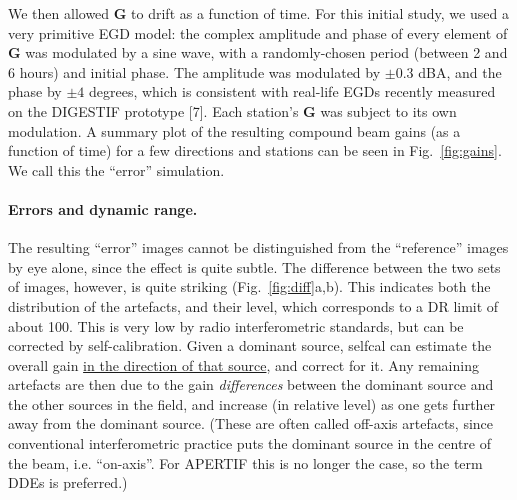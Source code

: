 \documentclass{aps2010} \special{papersize=8.5in,11in}
\begin{document}
We then allowed $\mathbf{G}$ to drift as a function of time. For this initial study, we used a very primitive EGD model: the complex amplitude and phase of every element of $\mathbf{G}$ was modulated by a  sine wave, with a randomly-chosen period (between 2 and 6 hours) and initial phase. The amplitude was modulated by $\pm0.3$ dBA, and the phase by $\pm4$ degrees, which is consistent with real-life EGDs recently measured on the DIGESTIF prototype
[7]. Each station's $\mathbf{G}$ was subject to its own modulation. A summary plot of the resulting compound beam gains (as a function of time) for a few directions and stations can be seen in Fig.~\ref{fig:gains}. We call this the ``error'' simulation.

\paragraph*{Errors and dynamic range.} The resulting ``error'' images cannot be distinguished from the ``reference'' images by eye alone, since the effect is quite subtle. The difference between the two sets of images, however, is quite striking (Fig.~\ref{fig:diff}a,b). This indicates both the distribution of the artefacts, and their level, which corresponds to a DR limit of about 100. This is very low by radio interferometric standards, but can be corrected by self-calibration. Given a dominant source, selfcal can estimate the overall gain \underline{in the direction of that source}, and correct for it. Any remaining artefacts are then due to the gain \emph{differences} between the dominant source and the other sources in the field, and increase (in relative level) as one gets further away from the dominant source. (These are often called off-axis artefacts, since conventional interferometric practice puts the dominant source in the centre of the beam, i.e. ``on-axis''. For APERTIF this is no longer the case, so the term DDEs is preferred.) 
\end{document}

